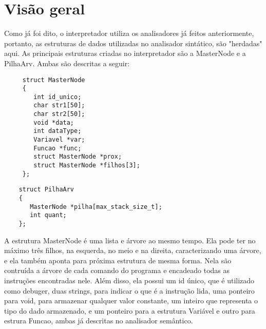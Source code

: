 \documentclass[a4paper,10pt]{article}
\begin{document}
\section{Visão geral}
	Como já foi dito, o interpretador utiliza os analisadores já feitos anteriormente, portanto, as estruturas de dados utilizadas no analisador 
	sintático, são "herdadas" aqui. As principais estruturas criadas no interpretador são a MasterNode e a PilhaArv. Ambas são descritas a seguir:
	\begin{verbatim}
     struct MasterNode
     {
        int id_unico;
        char str1[50];
        char str2[50];
        void *data; 
        int dataType;
        Variavel *var;
        Funcao *func; 
        struct MasterNode *prox;
        struct MasterNode *filhos[3];
     };		
	\end{verbatim}	
	\begin{verbatim}
    struct PilhaArv
    {
       MasterNode *pilha[max_stack_size_t];
       int quant;
    };
	\end{verbatim}	
	A estrutura MasterNode é uma lista e árvore ao mesmo tempo. Ela pode ter no máximo três filhos, na esquerda, no meio e na direita,
	caracterizando uma árvore, e ela também aponta para próxima estrutura de mesma forma. Nela são contruída a árvore de cada comando do programa e
	encadeado todas as instruções encontradas nele. Além disso, ela possui um id único, que é utilizado como debuger, duas strings, para indicar
	o que é a instrução lida, uma ponteiro para void, para armazenar qualquer valor constante, um inteiro que representa o tipo do dado armazenado,
	e um ponteiro para a estrutura Variável e outro para estrura Funcao, ambas já descritas no analisador semântico.\\
	
\end{document}
